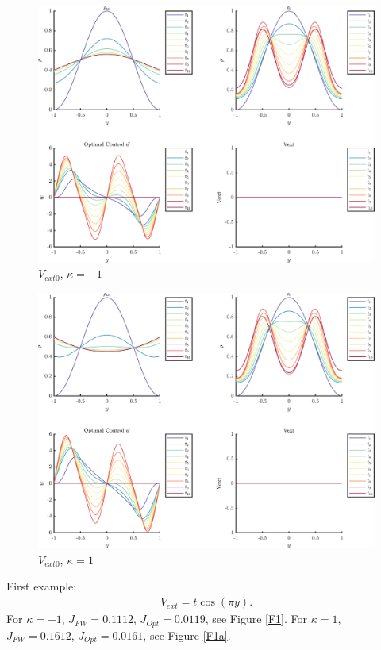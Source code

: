 \documentclass[11pt, a4paper]{article}
\theoremstyle{definition}
\begin{document}
\begin{figure}[h]
	\centering
	\includegraphics[scale=0.055]{Vext0n1.png}
	\caption{$V_{ext0}$, $\kappa = -1$} 
	\label{F0}
\end{figure}
\begin{figure}[h]
	\centering
	\includegraphics[scale=0.055]{Vext01.png}
	\caption{$V_{ext0}$, $\kappa = 1$} 
	\label{F0a}
\end{figure}
First example:
\begin{align*}
V_{ext} = t\cos(\pi y).
\end{align*}
For $\kappa = -1$, $J_{FW} = 0.1112$, $J_{Opt} = 0.0119$, see Figure \ref{F1}.
For $\kappa = 1$, $J_{FW} = 0.1612$, $J_{Opt} = 0.0161$, see Figure \ref{F1a}.
\end{document}
